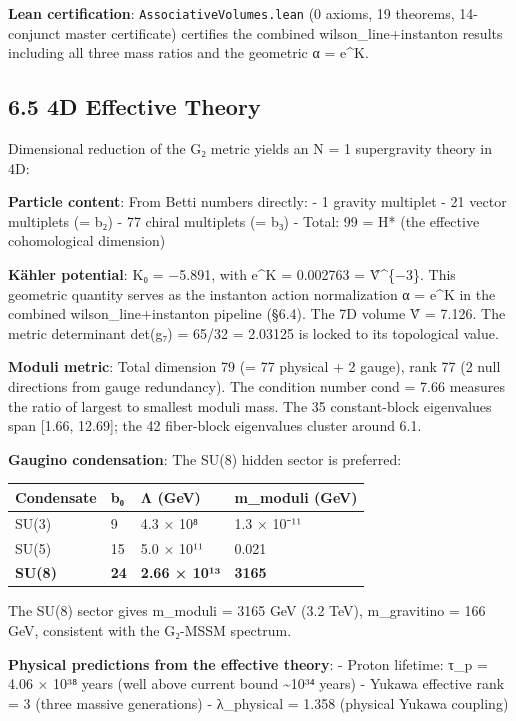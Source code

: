 \documentclass[11pt,a4paper]{article}
\begin{document}
\textbf{Lean certification}: \texttt{Associative\allowbreak{}Volumes.\allowbreak{}lean} (0 axioms, 19 theorems, 14-conjunct master certificate) certifies the combined wilson\_\allowbreak{}line+instanton results including all three mass ratios and the geometric α = e\^{}K.

\subsection{6.5 4D Effective Theory}\label{d-effective-theory}

Dimensional reduction of the G₂ metric yields an N = 1 supergravity theory in 4D:

\textbf{Particle content}: From Betti numbers directly: - 1 gravity multiplet - 21 vector multiplets (= b₂) - 77 chiral multiplets (= b₃) - Total: 99 = H* (the effective cohomological dimension)

\textbf{Kähler potential}: K₀ = −5.891, with e\^{}K = 0.002763 = V̂\^{}\{−3\}. This geometric quantity serves as the instanton action normalization α = e\^{}K in the combined wilson\_\allowbreak{}line+instanton pipeline (§6.4). The 7D volume V̂ = 7.126. The metric determinant det(g₇) = 65/32 = 2.03125 is locked to its topological value.

\textbf{Moduli metric}: Total dimension 79 (= 77 physical + 2 gauge), rank 77 (2 null directions from gauge redundancy). The condition number cond = 7.66 measures the ratio of largest to smallest moduli mass. The 35 constant-block eigenvalues span {[}1.66, 12.69{]}; the 42 fiber-block eigenvalues cluster around 6.1.

\textbf{Gaugino condensation}: The SU(8) hidden sector is preferred:

\begin{longtable}[]{@{}llll@{}}
\toprule\noalign{}
Condensate & b₀ & Λ (GeV) & m\_\allowbreak{}moduli (GeV) \\
\midrule\noalign{}
\endhead
\bottomrule\noalign{}
\endlastfoot
SU(3) & 9 & 4.3 × 10⁸ & 1.3 × 10⁻¹¹ \\
SU(5) & 15 & 5.0 × 10¹¹ & 0.021 \\
\textbf{SU(8)} & \textbf{24} & \textbf{2.66 × 10¹³} & \textbf{3165} \\
\end{longtable}

The SU(8) sector gives m\_\allowbreak{}moduli = 3165 GeV (3.2 TeV), m\_\allowbreak{}gravitino = 166 GeV, consistent with the G₂-MSSM spectrum.

\textbf{Physical predictions from the effective theory}: - Proton lifetime: τ\_\allowbreak{}p = 4.06 × 10³⁸ years (well above current bound \textasciitilde10³⁴ years) - Yukawa effective rank = 3 (three massive generations) - λ\_\allowbreak{}physical = 1.358 (physical Yukawa coupling)
\end{document}
